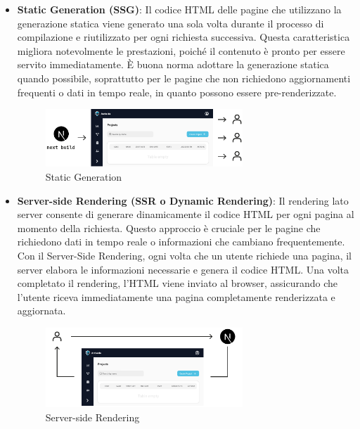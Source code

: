 \documentclass[target=bach,aauheader=,style=]{thud}
\begin{document}
\begin{itemize}
    \item \textbf{Static Generation (SSG)}: Il codice HTML delle pagine che utilizzano la generazione statica viene generato una sola volta durante il processo di compilazione e riutilizzato per ogni richiesta successiva. Questa caratteristica migliora notevolmente le prestazioni, poiché il contenuto è pronto per essere servito immediatamente. È buona norma adottare la generazione statica quando possibile, soprattutto per le pagine che non richiedono aggiornamenti frequenti o dati in tempo reale, in quanto possono essere pre-renderizzate.
    \begin{figure}[H]
        \centering
        \includegraphics[width=0.7\textwidth]{img/rendering/static_generation.pdf} 
        \caption{Static Generation}
    \end{figure}
    
    
    \item \textbf{Server-side Rendering (SSR o Dynamic Rendering)}: Il rendering lato server consente di generare dinamicamente il codice HTML per ogni pagina al momento della richiesta. Questo approccio è cruciale per le pagine che richiedono dati in tempo reale o informazioni che cambiano frequentemente. Con il Server-Side Rendering, ogni volta che un utente richiede una pagina, il server elabora le informazioni necessarie e genera il codice HTML. Una volta completato il rendering, l'HTML viene inviato al browser, assicurando che l'utente riceva immediatamente una pagina completamente renderizzata e aggiornata.
     \begin{figure}[H]
        \centering
        \includegraphics[width=0.7\textwidth]{img/rendering/server_side_rendering.pdf} 
        \caption{Server-side Rendering}
    \end{figure}
\end{itemize}
\end{document}
